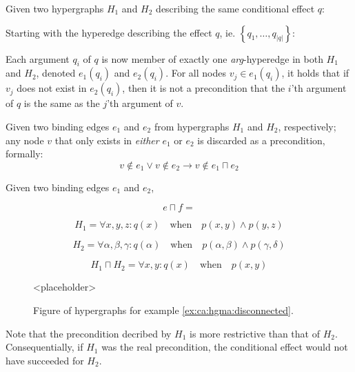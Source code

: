 \documentclass[../Master.tex]{subfiles}
\begin{document}
Given two hypergraphs $H_1$ and $H_2$ describing the same conditional effect $q$:

Starting with the hyperedge describing the effect $q$, ie. $\left\{ q_1, \dots, q_{|q|}  \right\}$:

Each argument $q_i$ of $q$ is now member of exactly one \emph{arg}-hyperedge in  both $H_1$ and $H_2$, denoted $e_1(q_i)$ and $e_2(q_i)$. For all nodes $v_j \in e_1(q_i)$, it holds that  if $v_j$ does not exist in $e_2(q_i)$, then it is not a precondition that the $i$'th argument of $q$ is the same as the $j$'th argument of $v$.

\begin{proposition}
    Given two binding edges $e_1$ and $e_2$ from hypergraphs $H_1$ and $H_2$, respectively; any node $v$ that only exists in \emph{either} $e_1$ or $e_2$ is discarded as a precondition, formally:
    \begin{equation*}
        v \notin e_1 \lor v \notin e_2 \rightarrow v \notin e_1 \sqcap e_2
    \end{equation*}
\end{proposition}

\begin{proposition}
    Given two binding edges $e_1$ and $e_2$,
\end{proposition}

\begin{equation}
    e \sqcap f =
\end{equation}

\begin{example} \label{ex:ca:hgma:disconnected}
    \begin{equation*}
        H_1 = \forall x, y, z : q(x) \quad \text{when} \quad
            p(x,y) \land p(y, z)
    \end{equation*}

    \begin{equation*}
        H_2 = \forall \alpha, \beta, \gamma : q(\alpha) \quad \text{when} \quad
            p(\alpha, \beta) \land p(\gamma, \delta)
    \end{equation*}

    \begin{equation*}
        H_1 \sqcap H_2 = \forall x, y : q(x) \quad \text{when} \quad p(x, y)
    \end{equation*}

    \begin{figure}
        <placeholder>
        \caption{\label{fig:ex:ca:hgma:ex:disconnected} Figure of hypergraphs for example \ref{ex:ca:hgma:disconnected}.}
    \end{figure}

    Note that the precondition decribed by $H_1$ is more restrictive than that of $H_2$. Consequentially, if $H_1$ was the real precondition, the conditional effect would not have succeeded for $H_2$.
\end{example}
\end{document}
